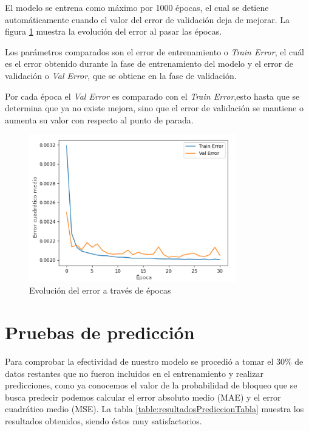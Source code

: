 El modelo se entrena como máximo por 1000 épocas, el cual se detiene automáticamente cuando el valor del error de validación deja de mejorar. La figura \ref{fig:errorEpocas} muestra la evolución del error al pasar las épocas.

Los parámetros comparados son el error de entrenamiento o \textit{Train Error}, el cuál es el error obtenido durante la fase de entrenamiento del modelo y el error de validación o \textit{Val Error}, que se obtiene en la fase de validación.

Por cada época el \textit{Val Error} es comparado con el  \textit{Train Error},esto hasta que se determina que ya no existe mejora, sino que el error de validación se mantiene o aumenta su valor con respecto al punto de parada.


\begin{figure}[H]
    \centering
    \includegraphics[width=9cm]{capitulos/img/graficoErrorEs.png}
    \caption{Evolución del error a través de épocas}
    \label{fig:errorEpocas}
\end{figure}

\section{Pruebas de predicción}
Para comprobar la efectividad de nuestro modelo se procedió a tomar el 30\% de datos restantes que no fueron incluidos en el entrenamiento y realizar predicciones, como ya conocemos el valor de la probabilidad de bloqueo que se busca predecir podemos calcular el error absoluto medio (MAE) y el error cuadrático medio (MSE). La tabla \ref{table:resultadosPrediccionTabla} muestra los resultados obtenidos, siendo éstos muy satisfactorios.

